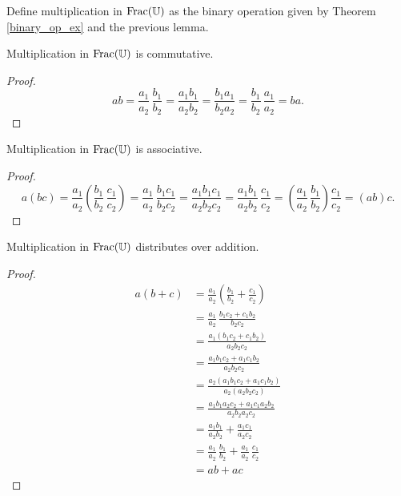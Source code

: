 \documentclass[../../math.tex]{subfiles}
\begin{document}
\begin{instance}
    Define multiplication in $\operatorname{Frac}(\mathbb{U})$ as the binary operation given by
    Theorem \ref{binary_op_ex} and the previous lemma.
\end{instance}

\begin{instance}
    Multiplication in $\operatorname{Frac}(\mathbb{U})$ is commutative.
\end{instance}
\begin{proof}
    \[
        ab
        = \frac{a_1}{a_2} \, \frac{b_1}{b_2}
        = \frac{a_1b_1}{a_2b_2}
        = \frac{b_1a_1}{b_2a_2}
        = \frac{b_1}{b_2} \, \frac{a_1}{a_2}
        = ba.
    \]
\end{proof}

\begin{instance}
    Multiplication in $\operatorname{Frac}(\mathbb{U})$ is associative.
\end{instance}
\begin{proof}
    \[
        a(bc)
        = \frac{a_1}{a_2} \left( \frac{b_1}{b_2} \, \frac{c_1}{c_2} \right)
        = \frac{a_1}{a_2} \, \frac{b_1c_1}{b_2c_2}
        = \frac{a_1b_1c_1}{a_2b_2c_2}
        = \frac{a_1b_1}{a_2b_2} \, \frac{c_1}{c_2}
        = \left( \frac{a_1}{a_2} \, \frac{b_1}{b_2} \right) \frac{c_1}{c_2}
        = (ab)c.
    \]
\end{proof}

\begin{instance}
    Multiplication in $\operatorname{Frac}(\mathbb{U})$ distributes over addition.
\end{instance}
\begin{proof}
    \begin{align*}
        a(b + c)
        &= \frac{a_1}{a_2} \left( \frac{b_1}{b_2} + \frac{c_1}{c_2} \right) \\
        &= \frac{a_1}{a_2} \, \frac{b_1c_2 + c_1b_2}{b_2c_2} \\
        &= \frac{a_1(b_1c_2 + c_1b_2)}{a_2b_2c_2} \\
        &= \frac{a_1b_1c_2 + a_1c_1b_2}{a_2b_2c_2} \\
        &= \frac{a_2(a_1b_1c_2 + a_1c_1b_2)}{a_2(a_2b_2c_2)} \\
        &= \frac{a_1b_1a_2c_2 + a_1c_1a_2b_2}{a_2b_2a_2c_2} \\
        &= \frac{a_1b_1}{a_2b_2} + \frac{a_1c_1}{a_2c_2} \\
        &= \frac{a_1}{a_2} \, \frac{b_1}{b_2}
            + \frac{a_1}{a_2} \, \frac{c_1}{c_2} \\
        &= ab + ac
    \end{align*}
\end{proof}
\end{document}
